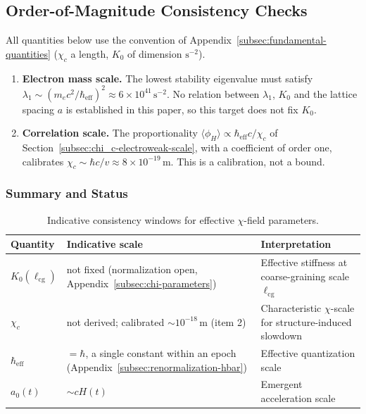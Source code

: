 \subsection{Order-of-Magnitude Consistency Checks}
\label{sec:consistency_checks}

All quantities below use the convention of Appendix~\ref{subsec:fundamental-quantities}
($\chi_c$ a length, $K_0$ of dimension $\mathrm{s}^{-2}$).
\begin{enumerate}
  \item \textbf{Electron mass scale.}
    The lowest stability eigenvalue must satisfy
    $\lambda_1 \sim (m_e c^2/\hbar_{\mathrm{eff}})^2
      \approx 6\times 10^{41}\,\mathrm{s^{-2}}$.
    No relation between $\lambda_1$, $K_0$ and the lattice spacing $a$ is established in this paper, so this target
    does not fix $K_0$.
  \item \textbf{Correlation scale.}
    The proportionality $\langle\phi_H\rangle \propto \hbar_{\mathrm{eff}}c/\chi_c$ of
    Section~\ref{subsec:chi_c-electroweak-scale}, with a coefficient of order one, calibrates
    $\chi_c \sim \hbar c/v \approx 8\times 10^{-19}\,\mathrm{m}$.
    This is a calibration, not a bound.
\end{enumerate}

\subsubsection*{Summary and Status}
\label{subsec:chi-parameters-summary-status}

\begin{table}[htbp]
  \centering
  \renewcommand{\arraystretch}{1.2}
  \begin{tabular}{|p{3.3cm}|p{4.3cm}|p{7.0cm}|}
    \hline
    \textbf{Quantity} &
    \textbf{Indicative scale} &
    \textbf{Interpretation} \\
    \hline
    $K_0(\ell_{\mathrm{cg}})$ &
    not fixed (normalization open, Appendix~\ref{subsec:chi-parameters}) &
    Effective stiffness at coarse-graining
    scale $\ell_{\mathrm{cg}}$ \\
    \hline
    $\chi_c$ &
    not derived; calibrated $\sim 10^{-18}\,\mathrm{m}$ (item 2) &
    Characteristic $\chi$-scale for
    structure-induced slowdown \\
    \hline
    $\hbar_{\mathrm{eff}}$ &
    $= \hbar$, a single constant within an epoch (Appendix~\ref{subsec:renormalization-hbar}) &
    Effective quantization scale \\
    \hline
    $a_0(t)$ &
    $\sim cH(t)$ &
    Emergent acceleration scale \\
    \hline
  \end{tabular}
  \caption{Indicative consistency windows for effective
    $\chi$-field parameters.}
  \label{tab:chi-parameters}
\end{table}

